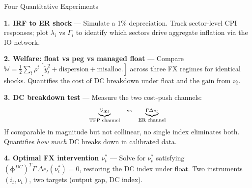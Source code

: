 \documentclass[aspectratio=169, 10pt]{beamer}
\newcommand{\ty}{\tilde{y}}
\begin{document}
\begin{frame}{Four Quantitative Experiments}

{\footnotesize \textbf{1. IRF to ER shock} --- Simulate a 1\% depreciation. Track sector-level CPI responses; plot $\lambda_i$ vs $\Gamma_i$ to identify which sectors drive aggregate inflation via the IO network.}

\vspace{4pt}
{\footnotesize \textbf{2. Welfare: float vs peg vs managed float} --- Compare $\mathbb{W} = \tfrac{1}{2}\sum_t\rho^t[\ty_t^2 + \text{dispersion} + \text{misalloc.}]$ across three FX regimes for identical shocks. Quantifies the cost of DC breakdown under float and the gain from $\nu_t$.}

\vspace{4pt}
{\footnotesize \textbf{3. DC breakdown test} --- Measure the two cost-push channels:
\[\scriptsize \underbrace{\mathcal{V}\bm{\chi}_t}_{\text{TFP channel}} \quad \text{vs} \quad \underbrace{\Gamma\Delta e_t}_{\text{ER channel}}\]
\vspace{-6pt}
If comparable in magnitude but not collinear, no single index eliminates both. Quantifies \emph{how much} DC breaks down in calibrated data.}

\vspace{4pt}
{\footnotesize \textbf{4. Optimal FX intervention $\nu_t^*$} --- Solve for $\nu_t^*$ satisfying $(\bm{\phi}^{DC})^T\Gamma\,\Delta e_t(\nu_t^*) = 0$, restoring the DC index under float. Two instruments $(i_t,\nu_t)$, two targets (output gap, DC index).}
\end{frame}
\end{document}
